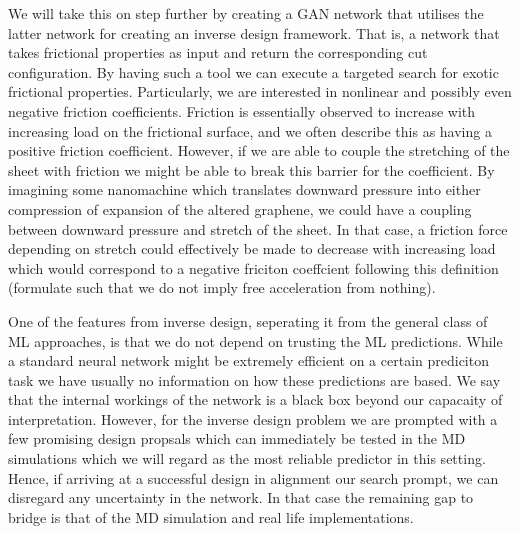 We will take this on step further by creating a GAN network that utilises the
latter network for creating an inverse design framework. That is, a network that
takes frictional properties as input and return the corresponding cut
configuration. By having such a tool we can execute a targeted search for exotic
frictional properties. Particularly, we are interested in nonlinear and possibly
even negative friction coefficients. Friction is essentially observed to
increase with increasing load on the frictional surface, and we often describe
this as having a positive friction coefficient. However, if we are able to
couple the stretching of the sheet with friction we might be able to break this barrier for the coefficient. By
imagining some nanomachine which translates downward pressure into either
compression of expansion of the altered graphene, we could have a coupling
between downward pressure and stretch of the sheet. In that case, a friction
force depending on stretch could effectively be made to decrease with increasing
load which would correspond to a negative friciton coeffcient following this
definition (formulate such that we do not imply free acceleration from nothing).

One of the features from inverse design, seperating it from the general class of ML approaches, is that we do not depend on trusting the ML predictions. While a standard neural network might be extremely efficient on a certain prediciton task we have usually no information on how these predictions are based. We say that the internal workings of the network is a black box beyond our capacaity of interpretation. However, for the inverse design problem we are prompted with a few promising design propsals which can immediately be tested in the MD simulations which we will regard as the most reliable predictor in this setting. Hence, if arriving at a successful design in alignment our search prompt, we can disregard any uncertainty in the network. In that case the remaining gap to bridge is that of the MD simulation and real life implementations. 






